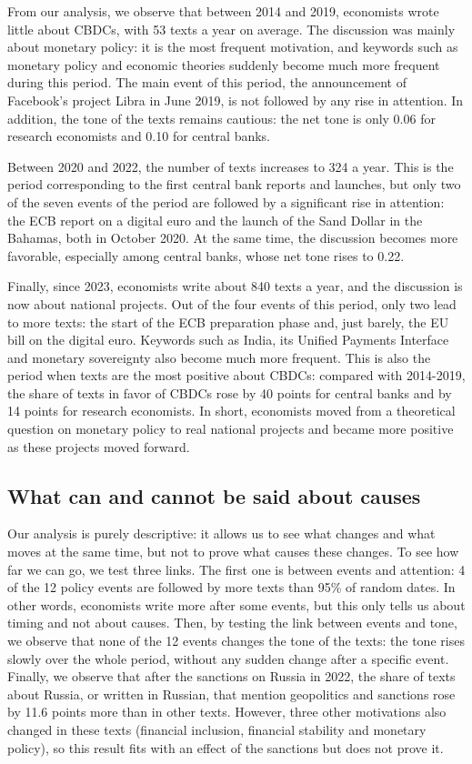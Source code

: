 \documentclass[11pt,a4paper]{article}
\begin{document}
From our analysis, we observe that between 2014 and 2019, economists wrote little about CBDCs, 
with 53 texts a year on average. The discussion was mainly about monetary policy: it is the most 
frequent motivation, and keywords such as monetary policy and economic theories suddenly become 
much more frequent during this period. The main event of this period, the announcement of Facebook’s 
project Libra in June 2019, is not followed by any rise in attention. In addition, the tone of the 
texts remains cautious: the net tone is only 0.06 for research economists and 0.10 for central banks. 

Between 2020 and 2022, the number of texts increases to 324 a year. This is the period corresponding 
to the first central bank reports and launches, but only two of the seven events of the period are 
followed by a significant rise in attention: the ECB report on a digital euro and the launch of the 
Sand Dollar in the Bahamas, both in October 2020. At the same time, the discussion becomes more 
favorable, especially among central banks, whose net tone rises to 0.22. 

Finally, since 2023, economists write about 840 texts a year, and the discussion is now about national 
projects. Out of the four events of this period, only two lead to more texts: the start of the ECB 
preparation phase and, just barely, the EU bill on the digital euro. Keywords such as India, its Unified 
Payments Interface and monetary sovereignty also become much more frequent. This is also the period when 
texts are the most positive about CBDCs: compared with 2014-2019, the share of texts in favor of CBDCs 
rose by 40 points for central banks and by 14 points for research economists. In short, economists moved 
from a theoretical question on monetary policy to real national projects and became more positive as these 
projects moved forward.


\subsection{What can and cannot be said about causes}

Our analysis is purely descriptive: it allows us to see what changes and what moves at the same time, but 
not to prove what causes these changes. To see how far we can go, we test three links. The first one is 
between events and attention: 4 of the 12 policy events are followed by more texts than 95\% of random 
dates. In other words, economists write more after some events, but this only tells us about timing and 
not about causes. Then, by testing the link between events and tone, we observe that none of the 12 events 
changes the tone of the texts: the tone rises slowly over the whole period, without any sudden change after 
a specific event. Finally, we observe that after the sanctions on Russia in 2022, the share of texts about 
Russia, or written in Russian, that mention geopolitics and sanctions rose by 11.6 points more than in other 
texts. However, three other motivations also changed in these texts (financial inclusion, financial stability 
and monetary policy), so this result fits with an effect of the sanctions but does not prove it.
\end{document}

